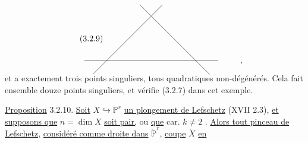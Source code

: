 \begin{equation}\tag{3.2.9}
\begin{tikzcd}[row sep=4.5em, column sep=4.5em]
	{} & {} \arrow[dl, dash, shorten <=-9mm, shorten >=-9mm] \arrow[dr, dash, shorten <=-9mm, shorten >=-9mm] & {} & {} \\
	{} \arrow[rr, dash, shorten <=-11mm, shorten >=-11mm] & {} & {} & {,}
\end{tikzcd}
\end{equation}
et a exactement trois points singuliers, tous quadratiques non-dégénérés. Cela fait ensemble douze points singuliers, et vérifie (3.2.7) dans cet exemple.



\underline{Proposition} 3.2.10. \underline{Soit} $X \hookrightarrow \mathbb{P}^{r}$ \underline{un plongement de Lefschetz} (XVII 2.3), \underline{et supposons que} $n = \dim X$ \underline{soit pair,} ou \underline{que} car. $k \neq 2$ . \underline{Alors tout pinceau de Lefschetz,} \underline{considéré comme droite dans} $\check{\mathbb{P}}^{r}$, \underline{coupe} $\check{X}$ \underline{en}

